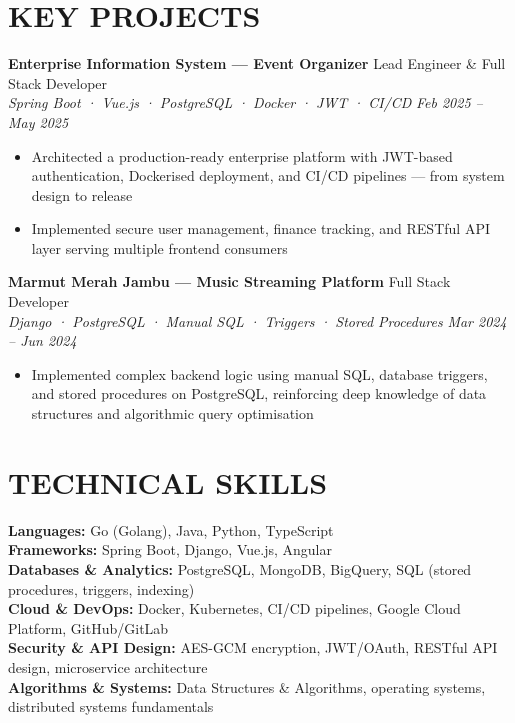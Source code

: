 \documentclass[10pt,a4paper]{article}
\newcommand{\experienceheader}[4]{
    \textbf{#1} \hfill #2 \\
    \textit{#3} \hfill \textit{#4}
}
\begin{document}
\vspace{-4pt}

\section*{KEY PROJECTS}

\experienceheader{Enterprise Information System — Event Organizer}{Lead Engineer \& Full Stack Developer}{Spring Boot · Vue.js · PostgreSQL · Docker · JWT · CI/CD}{Feb 2025 -- May 2025}
\begin{itemize}[leftmargin=*, itemsep=0.5pt, topsep=1pt]
    \item Architected a production-ready enterprise platform with JWT-based authentication, Dockerised deployment, and CI/CD pipelines — from system design to release
    \item Implemented secure user management, finance tracking, and RESTful API layer serving multiple frontend consumers
\end{itemize}

\vspace{2pt}

\experienceheader{Marmut Merah Jambu — Music Streaming Platform}{Full Stack Developer}{Django · PostgreSQL · Manual SQL · Triggers · Stored Procedures}{Mar 2024 -- Jun 2024}
\begin{itemize}[leftmargin=*, itemsep=0.5pt, topsep=1pt]
    \item Implemented complex backend logic using manual SQL, database triggers, and stored procedures on PostgreSQL, reinforcing deep knowledge of data structures and algorithmic query optimisation
\end{itemize}

\vspace{-4pt}

\section*{TECHNICAL SKILLS}

\textbf{Languages:} Go (Golang), Java, Python, TypeScript \\
\textbf{Frameworks:} Spring Boot, Django, Vue.js, Angular \\
\textbf{Databases \& Analytics:} PostgreSQL, MongoDB, BigQuery, SQL (stored procedures, triggers, indexing) \\
\textbf{Cloud \& DevOps:} Docker, Kubernetes, CI/CD pipelines, Google Cloud Platform, GitHub/GitLab \\
\textbf{Security \& API Design:} AES-GCM encryption, JWT/OAuth, RESTful API design, microservice architecture \\
\textbf{Algorithms \& Systems:} Data Structures \& Algorithms, operating systems, distributed systems fundamentals
\end{document}
